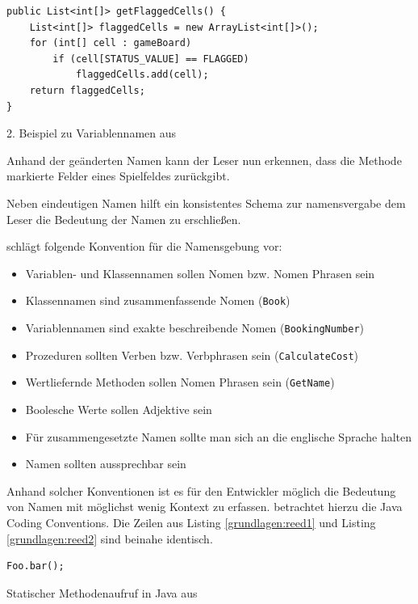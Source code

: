 \begin{listing}
    \begin{verbatim}
public List<int[]> getFlaggedCells() {
    List<int[]> flaggedCells = new ArrayList<int[]>();
    for (int[] cell : gameBoard)
        if (cell[STATUS_VALUE] == FLAGGED)
            flaggedCells.add(cell);
    return flaggedCells;
}
    \end{verbatim}
    \caption{2. Beispiel zu Variablennamen aus \cite[S. 47]{Martin}}
    \label{grundlagen:naminggood}
\end{listing}

Anhand der geänderten Namen kann der Leser nun erkennen, dass die Methode markierte Felder eines Spielfeldes zurückgibt.

Neben eindeutigen Namen hilft ein konsistentes Schema zur namensvergabe dem Leser die Bedeutung der Namen zu erschließen. 

\cite[S. 4]{Green} schlägt folgende Konvention für die Namensgebung vor:
\begin{itemize}
	\item Variablen- und Klassennamen sollen Nomen bzw. Nomen Phrasen sein
	\item Klassennamen sind zusammenfassende Nomen (\texttt{Book})
	\item Variablennamen sind exakte beschreibende Nomen (\texttt{BookingNumber})
	\item Prozeduren sollten Verben bzw. Verbphrasen sein (\texttt{CalculateCost})
	\item Wertliefernde Methoden sollen Nomen Phrasen sein (\texttt{GetName}) 
	\item Boolesche Werte sollen Adjektive sein
	\item Für zusammengesetzte Namen sollte man sich an die englische Sprache halten
	\item Namen sollten aussprechbar sein
\end{itemize}

Anhand solcher Konventionen ist es für den Entwickler möglich die Bedeutung von Namen mit möglichst wenig Kontext zu erfassen.
\cite{reed} betrachtet hierzu die Java Coding Conventions. Die Zeilen aus Listing \ref{grundlagen:reed1} und
Listing \ref{grundlagen:reed2} sind beinahe identisch. 

\begin{listing}
    \begin{verbatim}
Foo.bar();
    \end{verbatim}
    \caption{Statischer Methodenaufruf in Java aus \cite[S. 182]{reed}}
    \label{grundlagen:reed1}
\end{listing}

